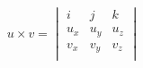 \documentclass[12pt]{article}
\begin{document}
\[
    u\times v = \begin{vmatrix}
        i & j & k \\
        u_x & u_y & u_z \\
        v_x & v_y & v_z \\
    \end{vmatrix}
\
\]
\end{document}
